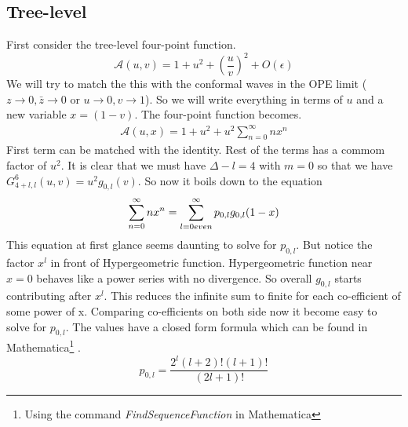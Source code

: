             \subsection{Tree-level}
                First consider the tree-level four-point function.
                \begin{equation}
                    \mathcal{A}(u,v) = 1 + u^{2} + \left    (\frac{u}{v}\right)^{2} + O(\epsilon)
                \end{equation}
                We will try to match the this with the  conformal waves in the OPE limit ($z\to 0,   \bar{z}\to0 $ or $u\to 0,v\to 1$). So we   will write everything in terms of $u$ and a   new variable $x = (1-v)$. The four-point  function becomes.
                \begin{eqnarray}
                    \mathcal{A}(u,x) = 1 + u^2 + u^2\sum_   {n=0}^{\infty} n x^n
                \end{eqnarray}
                First term can be matched with the identity.    Rest of the terms has a commom factor of   $u^2$. It is clear that we must have  $\Delta-l = 4$ with $m=0$ so that we have $G_    {4+l,l}^{6}(u,v) = u^2 g_{0,l}(v)$. So now  it boils down to the equation 
                \begin{equation}
                    \sum_{n=0}^{\infty} n x^n = \sum_{l=0 \\    even}^{\infty} p_{0,l} g_{0,l}(1-x) 
                \end{equation}
                This equation at first glance seems daunting    to solve for $p_{0,l}$. But notice the     factor $x^l$ in front of Hypergeometric     function. Hypergeometric function near $x=0$    behaves like a power series with no    divergence. So overall $g_{0,l}$ starts    contributing after $x^l$. This reduces the     infinite sum to finite for each co-efficient    of some power of x. Comparing co-efficients    on both side now it become easy to solve for   $p_{0,l}$. The values have a closed form  formula which can be found in    Mathematica\footnote{Using the command     \textit{FindSequenceFunction} in Mathematica}   .
                \begin{equation}
                    p_{0,l} = \frac{2^l (l+2)!(l+1)! }{(2l+1)!}   
                \end{equation} 
